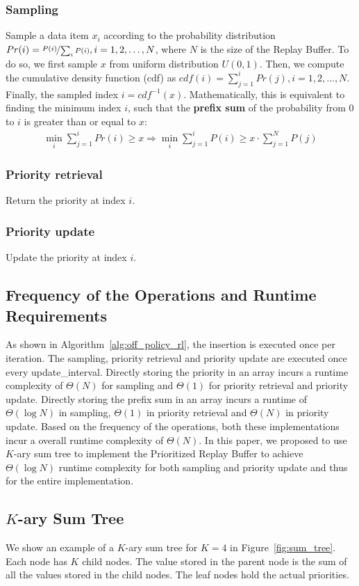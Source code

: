 \subsubsection{Sampling}
Sample a data item $x_i$ according to the probability distribution $Pr(i)=\nicefrac{P(i)}{\sum_{i}P(i)}, i=1,2,\ldots, N$, where $N$ is the size of the Replay Buffer. To do so, we first sample $x$ from uniform distribution $U(0,1)$. Then, we compute the cumulative density function (cdf) as $cdf(i)=\sum_{j=1}^{i}Pr(j), i=1,2,\ldots, N$. Finally, the sampled index $i=cdf^{-1}(x)$. Mathematically, this is equivalent to finding the minimum index $i$, such that the \textbf{prefix sum} of the probability from 0 to $i$ is greater than or equal to $x$:
\begin{align}
    \min_{i}\sum_{j=1}^{i}Pr(i)\geq x \Rightarrow \min_{i}\sum_{j=1}^{i}P(i)\geq x\cdot \sum_{j=1}^{N}P(j)
    \label{eq:prefix_sum}
\end{align}
\subsubsection{Priority retrieval}
Return the priority at index $i$.
\subsubsection{Priority update}
Update the priority at index $i$.

\subsection{Frequency of the Operations and Runtime Requirements} 
As shown in Algorithm~\ref{alg:off_policy_rl}, the insertion is executed once per iteration. The sampling, priority retrieval and priority update are executed once every update\_interval. Directly storing the priority in an array incurs a runtime complexity of $\Theta(N)$ for sampling and $\Theta(1)$ for priority retrieval and priority update. Directly storing the prefix sum in an array incurs a runtime of $\Theta(\log N)$ in sampling, $\Theta(1)$ in priority retrieval and $\Theta(N)$ in priority update. Based on the frequency of the operations, both these implementations incur a overall runtime complexity of $\Theta(N)$. In this paper, we proposed to use $K$-ary sum tree to implement the Prioritized Replay Buffer to achieve $\Theta(\log N)$ runtime complexity for both sampling and priority update and thus for the entire implementation.

\subsection{$K$-ary Sum Tree}\label{sec:sum_tree}
We show an example of a $K$-ary sum tree for $K=4$ in Figure~\ref{fig:sum_tree}. Each node has $K$ child nodes. The value stored in the parent node is the sum of all the values stored in the child nodes. The leaf nodes hold the actual priorities. 

